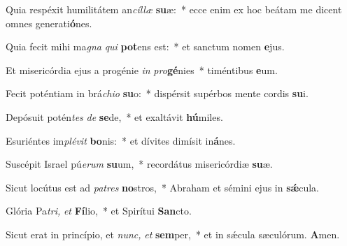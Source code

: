 \item Quia respéxit humilitátem an\textit{cíllæ} \textbf{su}æ:~* ecce enim ex hoc beátam me dicent omnes generati\textbf{ó}nes.
\item Quia fecit mihi ma\textit{gna} \textit{qui} \textbf{pot}ens est:~* et sanctum nomen \textbf{e}jus.
\item Et misericórdia ejus a progénie \textit{in} \textit{pro}\textbf{gé}nies~* timéntibus \textbf{e}um.
\item Fecit poténtiam in brá\textit{chio} \textbf{su}o:~* dispérsit supérbos mente cordis \textbf{su}i.
\item Depósuit potén\textit{tes} \textit{de} \textbf{se}de,~* et exaltávit \textbf{hú}miles.
\item Esuriéntes im\textit{plévit} \textbf{bo}nis:~* et dívites dimísit in\textbf{á}nes.
\item Suscépit Israel pú\textit{erum} \textbf{su}um,~* recordátus misericórdiæ \textbf{su}æ.
\item Sicut locútus est ad \textit{patres} \textbf{no}stros,~* Abraham et sémini ejus in \textbf{sǽ}cula.
\item Glória Pa\teenyhspace\textit{tri,} \textit{et} \textbf{Fí}lio,~* et Spirítui \textbf{San}cto.
\item Sicut erat in princípio, et \textit{nunc,} \textit{et} \textbf{sem}per,~* et in sǽcula sæculórum. \textbf{A}men.